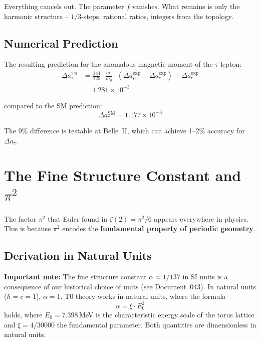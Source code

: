 	Everything cancels out. The parameter $f$ vanishes. What remains is only the harmonic structure -- $1/3$-steps, rational ratios, integers from the topology.
	
	\subsection{Numerical Prediction}
	
	The resulting prediction for the anomalous magnetic moment of the $\tau$ lepton:
	\begin{align}
		\Delta a_\tau^{\text{T0}} &= \frac{144}{125} \cdot \frac{m_\tau}{m_\mu} \cdot (\Delta a_\mu^{\text{exp}} - \Delta a_e^{\text{exp}}) + \Delta a_e^{\text{exp}} \\
		&= 1.281 \times 10^{-3}
	\end{align}
	
	compared to the SM prediction:
	\begin{equation}
		\Delta a_\tau^{\text{SM}} = 1.177 \times 10^{-3}
	\end{equation}
	
	The 9\% difference is testable at Belle~II, which can achieve 1--2\% accuracy for $\Delta a_\tau$.


	\section{The Fine Structure Constant and $\pi^2$}
	
	The factor $\pi^2$ that Euler found in $\zeta(2) = \pi^2/6$ appears everywhere in physics. This is because $\pi^2$ encodes the \textbf{fundamental property of periodic geometry}.
	
	\subsection{Derivation in Natural Units}
	
	\textbf{Important note:} The fine structure constant $\alpha \approx 1/137$ in SI units is a consequence of our historical choice of units (see Document~043). In natural units ($\hbar = c = 1$), $\alpha = 1$. T0 theory works in natural units, where the formula
	\begin{equation}
		\alpha = \xi \cdot E_0^2
		\label{eq:alpha-derivation}
	\end{equation}
	holds, where $E_0 = 7.398$\,MeV is the characteristic energy scale of the torus lattice and $\xi = 4/30000$ the fundamental parameter. Both quantities are dimensionless in natural units.
	
